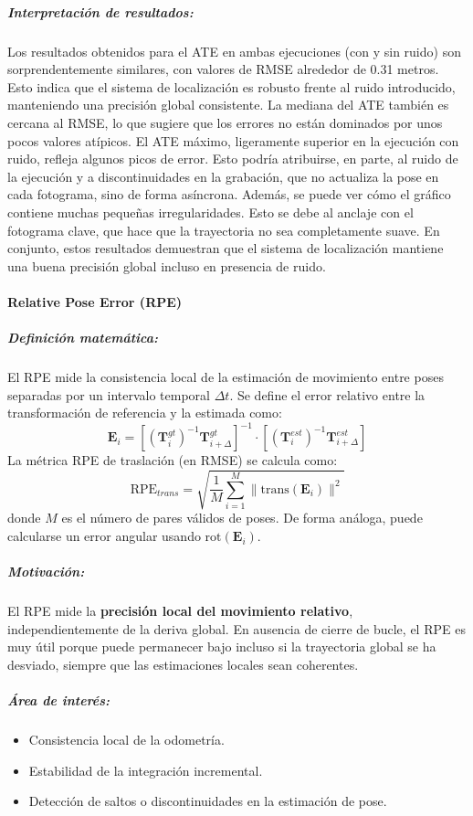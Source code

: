 \documentclass[12pt, a4paper, twoside]{article}
\begin{document}
\subparagraph{Interpretación de resultados:}
Los resultados obtenidos para el ATE\cite{Chen2022DELOATE} en ambas ejecuciones (con y sin ruido) son
sorprendentemente similares, con valores de RMSE alrededor de 0.31 metros.
Esto indica que el sistema de localización es robusto frente al ruido introducido,
manteniendo una precisión global consistente.\newline
La mediana del ATE\cite{Chen2022DELOATE} también es cercana al RMSE, lo que sugiere que
los errores no están dominados por unos pocos valores atípicos.
El ATE\cite{Chen2022DELOATE} máximo, ligeramente superior en la ejecución con ruido, refleja
algunos picos de error. Esto podría atribuirse, en parte, al ruido de la ejecución y 
a discontinuidades en la grabación, que no actualiza la pose en cada fotograma, sino
de forma asíncrona.\newline
Además, se puede ver cómo el gráfico contiene muchas pequeñas irregularidades. Esto se 
debe al anclaje con el fotograma clave, que hace que la trayectoria no sea completamente suave.
En conjunto, estos resultados demuestran que el sistema de localización
mantiene una buena precisión global incluso en presencia de ruido.

\paragraph{Relative Pose Error (RPE\cite{Sturm2012RPE})}
\subparagraph{Definición matemática:}
El RPE\cite{Sturm2012RPE} mide la consistencia local de la estimación de movimiento entre poses 
separadas por un intervalo temporal $\Delta t$.
Se define el error relativo entre la transformación de referencia y la estimada como:
\[
\mathbf{E}_i =
\left[
(\mathbf{T}^{gt}_i)^{-1}\mathbf{T}^{gt}_{i+\Delta}
\right]^{-1}
\cdot
\left[
(\mathbf{T}^{est}_i)^{-1}\mathbf{T}^{est}_{i+\Delta}
\right]
\]
La métrica RPE\cite{Sturm2012RPE} de traslación (en RMSE) se calcula como:
\[
\text{RPE}_{trans} =
\sqrt{\frac{1}{M}\sum_{i=1}^{M}
\|\mathrm{trans}(\mathbf{E}_i)\|^2 }
\]
donde $M$ es el número de pares válidos de poses.
De forma análoga, puede calcularse un error angular usando $\mathrm{rot}(\mathbf{E}_i)$.

\subparagraph{Motivación:}
El RPE\cite{Sturm2012RPE} mide la \textbf{precisión local del movimiento relativo}, 
independientemente de la deriva global.
En ausencia de cierre de bucle, el RPE\cite{Sturm2012RPE} es muy útil porque 
puede permanecer bajo incluso si la trayectoria global se ha desviado,
siempre que las estimaciones locales sean coherentes.
\subparagraph{Área de interés:}
\begin{itemize}
  \item Consistencia local de la odometría.
  \item Estabilidad de la integración incremental.
  \item Detección de saltos o discontinuidades en la estimación de pose.
\end{itemize}
\end{document}
